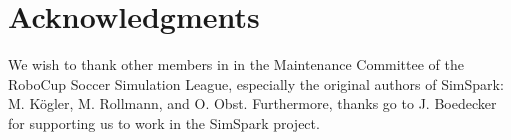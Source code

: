 \documentclass{llncs}
\begin{document}
\section*{Acknowledgments}
We wish to thank other members in in the Maintenance Committee of the RoboCup Soccer Simulation League, especially the original authors of SimSpark: M. K\"ogler, M. Rollmann, and O. Obst. Furthermore, thanks go to J. Boedecker for supporting us to work in the SimSpark project.


\end{document}
